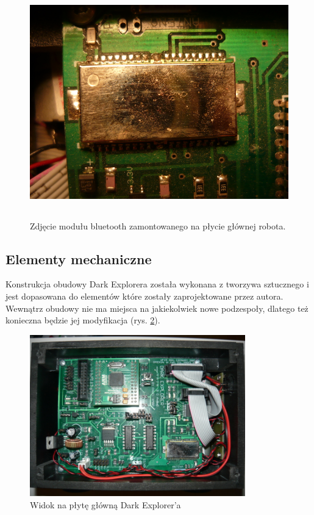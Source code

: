 \begin{figure}[!ht]
 \centering
 \includegraphics[height=100mm]{../images/ch02/btm-222.jpg}
 \caption{Zdjęcie modułu bluetooth zamontowanego na płycie głównej robota.}
 \label{fig:BTM222}
\end{figure}

\subsection{Elementy mechaniczne}
Konstrukcja obudowy Dark Explorera została wykonana z tworzywa sztucznego i jest
dopasowana do elementów które zostały zaprojektowane przez autora. Wewnątrz
obudowy nie ma miejsca na jakiekolwiek nowe podzespoły, dlatego też konieczna
będzie jej modyfikacja (rys. \ref{fig:KmakMainBoard}).

\begin{figure}[!ht]
 \centering
 \includegraphics[height=70mm]{../images/ch02/main_board.jpg}
 \caption{Widok na płytę główną Dark Explorer'a}
 \label{fig:KmakMainBoard}
\end{figure}

